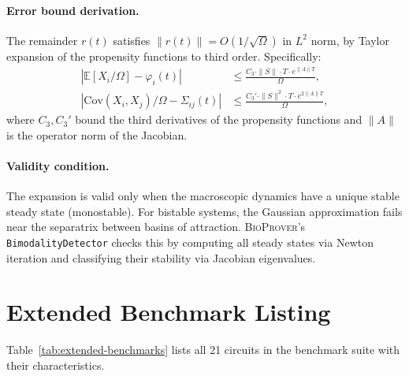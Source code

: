 \documentclass[11pt]{article}
\newcommand{\bioprover}{\textsc{BioProver}}
\begin{document}
\paragraph{Error bound derivation.}
The remainder $r(t)$ satisfies $\|r(t)\| = O(1/\sqrt{\Omega})$ in
$L^2$ norm, by Taylor expansion of the propensity functions to
third order. Specifically:
\begin{align}
|\mathbb{E}[X_i/\Omega] - \varphi_i(t)| &\leq
  \frac{C_3 \cdot \|S\| \cdot T \cdot e^{\|A\|T}}{\Omega}, \\
|\text{Cov}(X_i, X_j)/\Omega - \Sigma_{ij}(t)| &\leq
  \frac{C_3' \cdot \|S\|^2 \cdot T \cdot e^{2\|A\|T}}{\Omega},
\end{align}
where $C_3, C_3'$ bound the third derivatives of the propensity
functions and $\|A\|$ is the operator norm of the Jacobian.

\paragraph{Validity condition.}
The expansion is valid only when the macroscopic dynamics have a
unique stable steady state (monostable). For bistable systems, the
Gaussian approximation fails near the separatrix between basins of
attraction. \bioprover{}'s \texttt{BimodalityDetector} checks this
by computing all steady states via Newton iteration and classifying
their stability via Jacobian eigenvalues.

\section{Extended Benchmark Listing}
\label{app:extended-benchmarks}

Table~\ref{tab:extended-benchmarks} lists all 21 circuits in the
benchmark suite with their characteristics.
\end{document}

